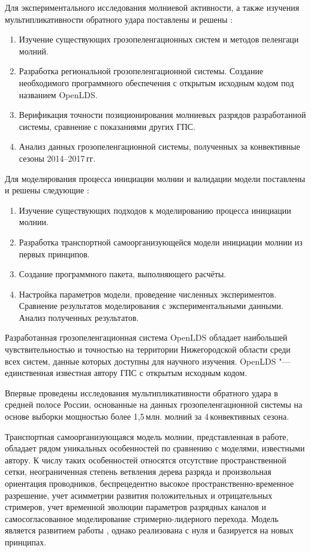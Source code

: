 Для экспериментального исследования молниевой активности, а также изучения мультипликативности обратного удара поставлены и решены {\tasks}:
\begin{enumerate}
	\item Изучение существующих грозопеленгационных систем и методов пеленгаци молний.
	\item Разработка региональной грозопеленгационной системы. Создание необходимого программного обеспечения с открытым исходным кодом под названием OpenLDS.
	\item Верификация точности позиционирования молниевых разрядов разработанной системы, сравнение с показаниями других ГПС.
	\item Анализ данных грозопеленгационной системы, полученных за конвективные сезоны 2014--2017\,гг.
\end{enumerate}

Для моделирования процесса инициации молнии и валидации модели поставлены и решены следующие {\tasks}:
\begin{enumerate}
	\item Изучение существующих подходов к моделированию процесса инициации молнии.
	\item Разработка транспортной самоорганизующейся модели инициации молнии из первых принципов.
	\item Создание программного пакета, выполняющего расчёты.
	\item Настройка параметров модели, проведение численных экспериментов. Сравнение результатов моделирования с экспериментальными данными. Анализ полученных результатов.
\end{enumerate}


{\novelty}

Разработанная грозопеленгационная система OpenLDS обладает наибольшей чувствительностью и точностью на территории Нижегородской области среди всех систем, данные которых доступны для научного изучения. OpenLDS "--- единственная известная автору ГПС с открытым исходным кодом. 

Впервые проведены исследования мультипликативности обратного удара в средней полосе России, основанные на данных грозопеленгационной системы на основе выборки мощностью более 1,5\,млн. молний за 4\,конвективных сезона. 

Транспортная самоорганизующаяся модель молнии, представленная в работе, обладает рядом уникальных особенностей по сравнению с моделями, известными автору. К числу таких особенностей относятся отсутствие пространственной сетки, неограниченная степень ветвления дерева разряда и произвольная ориентация проводников, беспрецедентно высокое пространственно-временное разрешение, учет асимметрии развития положительных и отрицательных стримеров, учет временной эволюции параметров разрядных каналов и самосогласованное моделирование стримерно-лидерного перехода. Модель является развитием работы \autocite{IudinRakov2017}, однако реализована с нуля и базируется на новых принципах.



